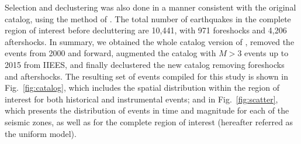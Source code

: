Selection and declustering was also done in a manner consistent with the original catalog, using the me\-thod of \citet{Gardner1974}. The total number of earthquakes in the complete region of interest before decluttering are 10,441, with 971 foreshocks and 4,206 aftershocks. In summary, we obtained the whole catalog version of \citet{Zare2014}, removed the events from 2000 and forward, augmented the catalog with $M>3$ events up to 2015 from IIEES, and finally declustered the new catalog removing foreshocks and aftershocks. The resulting set of events compiled for this study is shown in Fig.~\ref{fig:catalog}, which includes the spatial distribution within the region of interest for both historical and instrumental events; and in Fig.~\ref{fig:scatter}, which presents the distribution of events in time and magnitude for each of the seismic zones, as well as for the complete region of interest (hereafter referred as the uniform model).
